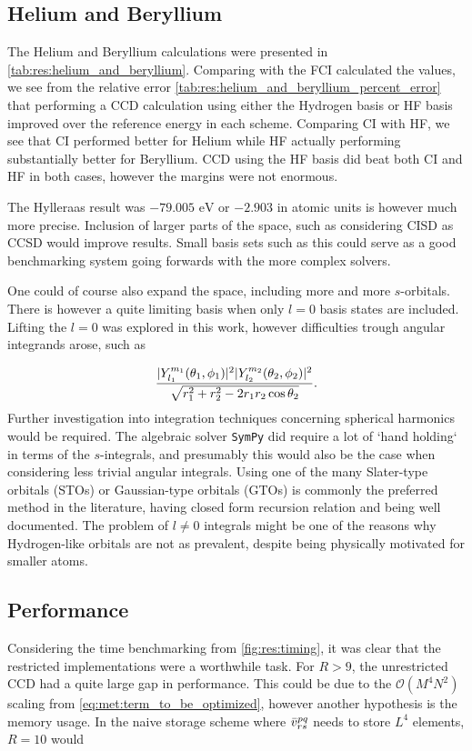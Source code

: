 \subsection{Helium and Beryllium}
The Helium and Beryllium calculations were presented in \cref{tab:res:helium_and_beryllium}. Comparing with the FCI calculated the values, we see from the relative error \cref{tab:res:helium_and_beryllium_percent_error} that performing a CCD calculation using either the Hydrogen basis or HF basis improved over the reference energy in each scheme. Comparing CI with HF, we see that CI performed better for Helium while HF actually performing substantially better for Beryllium. CCD using the HF basis did beat both CI and HF in both cases, however the margins were not enormous.

The Hylleraas result \citep{hylleraasNumerischeBerechnung2STerme1930} was $-79.005 \text{ eV}$ or $-2.903$ in atomic units is however much more precise. Inclusion of larger parts of the space, such as considering CISD as CCSD would improve results. Small basis sets such as this could serve as a good benchmarking system going forwards with the more complex solvers.

One could of course also expand the space, including more and more $s$-orbitals. There is however a quite limiting basis when only $l=0$ basis states are included. Lifting the $l = 0$ was explored in this work, however difficulties trough  angular integrands arose, such as

\begin{align*}
    \frac{|Y^{m_1}_{l_1}(\theta_1,\phi_1)|^2|Y^{m_2}_{l_2}(\theta_2,\phi_2)|^2}{\sqrt{r_1^2 + r_2 ^2 - 2r_1 r_2 \cos \theta_2 }}.
\end{align*}
Further investigation into integration techniques concerning spherical harmonics would be required. The algebraic solver \verb|SymPy| did require a lot of `hand holding` in terms of the $s$-integrals, and presumably this would also be the case when considering less trivial angular integrals. Using one of the many Slater-type orbitals (STOs) or Gaussian-type orbitals (GTOs) is commonly the preferred method in the literature, having closed form recursion relation and being well documented. The problem of $l \neq 0$ integrals might be one of the reasons why Hydrogen-like orbitals are not as prevalent, despite being physically motivated for smaller atoms.  

\subsection{Performance}
Considering the time benchmarking from \cref{fig:res:timing}, it was clear that the restricted implementations were a worthwhile task. For $R > 9$, the unrestricted CCD had a quite large gap in performance. This could be due to the $\mathcal{O}(M^4 N^2)$ scaling from \cref{eq:met:term_to_be_optimized}, however another hypothesis is the memory usage. In the naive storage scheme where $\bar{v}^{pq}_{rs}$ needs to store $L^4$ elements, $R = 10$ would 

